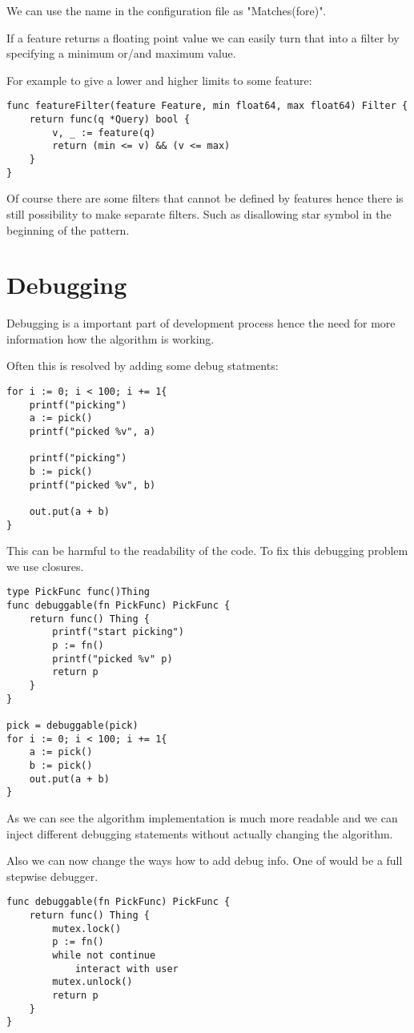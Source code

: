 We can use the name in the configuration file as "Matches(fore)".

If a feature returns a floating point value we can easily turn that
into a filter by specifying a minimum or/and maximum value.

For example to give a lower and higher limits to some feature:

\begin{verbatim}
func featureFilter(feature Feature, min float64, max float64) Filter {
    return func(q *Query) bool {
        v, _ := feature(q)
        return (min <= v) && (v <= max)
    }
}
\end{verbatim}

Of course there are some filters that cannot be defined by features hence
there is still possibility to make separate filters. Such as disallowing
star symbol in the beginning of the pattern.

\section{Debugging}

Debugging is a important part of development process hence the need for 
more information how the algorithm is working.

Often this is resolved by adding some debug statments:

\begin{verbatim}
for i := 0; i < 100; i += 1{
    printf("picking")
    a := pick()
    printf("picked %v", a)

    printf("picking")
    b := pick()
    printf("picked %v", b)
    
    out.put(a + b)
}
\end{verbatim}

This can be harmful to the readability of the code. To fix this debugging problem we use closures.

\begin{verbatim}
type PickFunc func()Thing
func debuggable(fn PickFunc) PickFunc {
    return func() Thing {
        printf("start picking")
        p := fn()
        printf("picked %v" p)
        return p
    }
}

pick = debuggable(pick)
for i := 0; i < 100; i += 1{
    a := pick()
    b := pick()
    out.put(a + b)
}
\end{verbatim}

As we can see the algorithm implementation is much more readable and 
we can inject different debugging statements without actually changing the algorithm.

Also we can now change the ways how to add debug info. One of would 
be a full stepwise debugger.

\begin{verbatim}
func debuggable(fn PickFunc) PickFunc {
    return func() Thing {
        mutex.lock()
        p := fn()
        while not continue
            interact with user
        mutex.unlock()
        return p
    }
}
\end{verbatim}